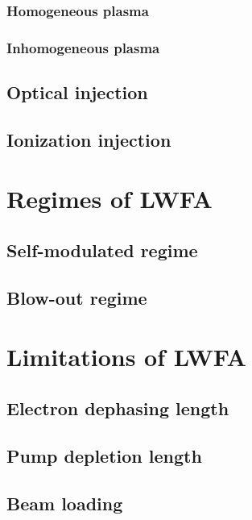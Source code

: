 \documentclass[10pt, twoside, a4paper, openright]{report}
\begin{document}
\subsubsection{Homogeneous plasma}
%

\subsubsection{Inhomogeneous plasma}
%

\subsection{Optical injection}
%

\subsection{Ionization injection}
%

\section{Regimes of LWFA}
%

\subsection{Self-modulated regime}

\subsection{Blow-out regime}

\section{Limitations of LWFA}
%

\subsection{Electron dephasing length}

\subsection{Pump depletion length}

\subsection{Beam loading}
\end{document}
